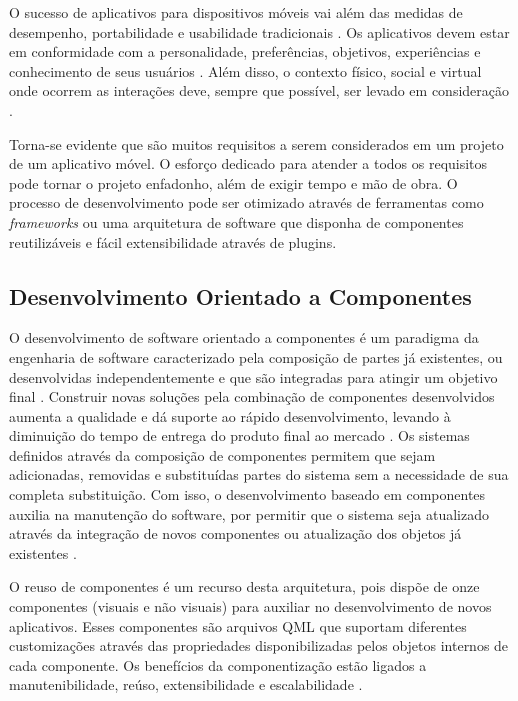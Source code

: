 O sucesso de aplicativos para dispositivos móveis vai além das medidas de desempenho, portabilidade e usabilidade tradicionais \cite{Kronbauer:2012:UEE:2393536.2393582}. Os aplicativos devem estar em conformidade com a personalidade, preferências, objetivos, experiências e conhecimento de seus usuários \cite{Vermeeren:2010:UEE:1868914.1868973}. Além disso, o contexto físico, social e virtual onde ocorrem as interações deve, sempre que possível, ser levado em consideração \cite{McCarthy:2004:TE:1015530.1015549}.\par

Torna-se evidente que são muitos requisitos a serem considerados em um projeto de um aplicativo móvel. O esforço dedicado para atender a todos os requisitos pode tornar o projeto enfadonho, além de exigir tempo e mão de obra. O processo de desenvolvimento pode ser otimizado através de ferramentas como \textit{frameworks} ou uma arquitetura de software que disponha de componentes reutilizáveis e fácil extensibilidade através de plugins.


\subsection{Desenvolvimento Orientado a Componentes}
O desenvolvimento de software orientado a componentes é um paradigma da engenharia de software caracterizado pela composição de partes já existentes, ou desenvolvidas independentemente e que são integradas para atingir um objetivo final \cite{rafael_heider}. Construir novas soluções pela combinação de componentes desenvolvidos aumenta a qualidade e dá suporte ao rápido desenvolvimento, levando à diminuição do tempo de entrega do produto final ao mercado \cite{rafael_heider}. Os sistemas definidos através da composição de componentes permitem que sejam adicionadas, removidas e substituídas partes do sistema sem a necessidade de sua completa substituição. Com isso, o desenvolvimento baseado em componentes auxilia na manutenção do software, por permitir que o sistema seja atualizado através da integração de novos componentes ou atualização dos objetos já existentes \cite{szyperski_bosch_weck_1999}.\par

O reuso de componentes é um recurso desta arquitetura, pois dispõe de onze componentes (visuais e não visuais) para auxiliar no desenvolvimento de novos aplicativos. Esses componentes são arquivos QML que suportam diferentes customizações através das propriedades disponibilizadas pelos objetos internos de cada componente. Os benefícios da componentização estão ligados a manutenibilidade, reúso, extensibilidade e escalabilidade \cite{D'Souza:1998:OCF:291139}.


